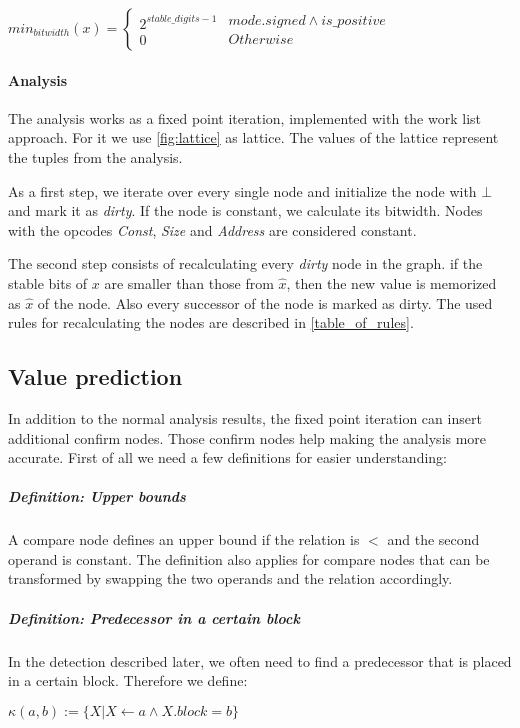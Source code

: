 $
min_{bitwidth}(x)=
\left\{
\begin{array}{l}2^{stable\_digits-1}\\0\end{array}
\begin{array}{l} {mode.signed \wedge is\_positive} \\ {Otherwise} \end{array}
\right.
$



\paragraph{Analysis}
\label{analysis_explain}
The analysis works as a fixed point iteration, implemented with the work list approach. For it we use  \autoref{fig:lattice} as lattice. The values of the lattice represent the tuples from the analysis.

As a first step, we iterate over every single node and initialize the node with $\bot$ and mark it as \textit{dirty}. If the node is constant, we calculate its bitwidth. Nodes with the opcodes \textit{Const}, \textit{Size} and \textit{Address} are considered constant.

The second step consists of recalculating every \textit{dirty} node in the graph. 
if the stable bits of $x$ are smaller than those from $\hat{x}$, 
then the new value is memorized as $\hat{x}$ of the node. Also every successor of the node is marked as dirty. The used rules for recalculating the nodes are described in \autoref{table_of_rules}.

\subsection{Value prediction}
In addition to the normal analysis results, the fixed point iteration can insert additional confirm nodes. Those confirm nodes help making the analysis more accurate.
First of all we need a few definitions for easier understanding:



\subparagraph{Definition: Upper bounds}
A compare node defines an upper bound if the relation is $<$ and the second operand is constant.\newline
The definition also applies for compare nodes that can be transformed by swapping the two operands and the relation accordingly.

\subparagraph{Definition: Predecessor in a certain block}
In the detection described later, we often need to find a predecessor that is placed in a certain block. Therefore we define:
\begin{center}
$\kappa(a, b) := \{X| X \leftarrow a \wedge X.block = b \}$ 
\end{center}

